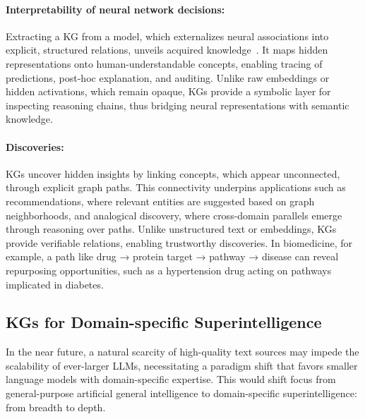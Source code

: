 \documentclass[10pt]{article}
\begin{document}
\paragraph{Interpretability of neural network decisions:}
Extracting a KG from a model, which externalizes neural associations into explicit, structured relations, unveils acquired knowledge~\cite{swamy2021interpreting-llm_kg-extraction}. It maps hidden representations onto human-understandable concepts, enabling tracing of predictions, post-hoc explanation, and auditing. Unlike raw embeddings or hidden activations, which remain opaque, KGs provide a symbolic layer for inspecting reasoning chains, thus bridging neural representations with semantic knowledge. 

\paragraph{Discoveries:}
KGs uncover hidden insights by linking concepts, which appear unconnected, through explicit graph paths. This connectivity underpins applications such as recommendations, where relevant entities are suggested based on graph neighborhoods, and analogical discovery, where cross-domain parallels emerge through reasoning over paths. Unlike unstructured text or embeddings, KGs provide verifiable relations, enabling trustworthy discoveries. In biomedicine, for example, a path like drug → protein target → pathway → disease can reveal repurposing opportunities, such as a hypertension drug acting on pathways implicated in diabetes.

\subsection{KGs for Domain-specific Superintelligence}
\label{subsec:superintelligence}

In the near future, a natural scarcity of high-quality text sources may impede the scalability of ever-larger LLMs, necessitating a paradigm shift that favors smaller language models with domain-specific expertise. This would shift focus from general-purpose artificial general intelligence to domain-specific superintelligence: from breadth to depth. 
\end{document}
